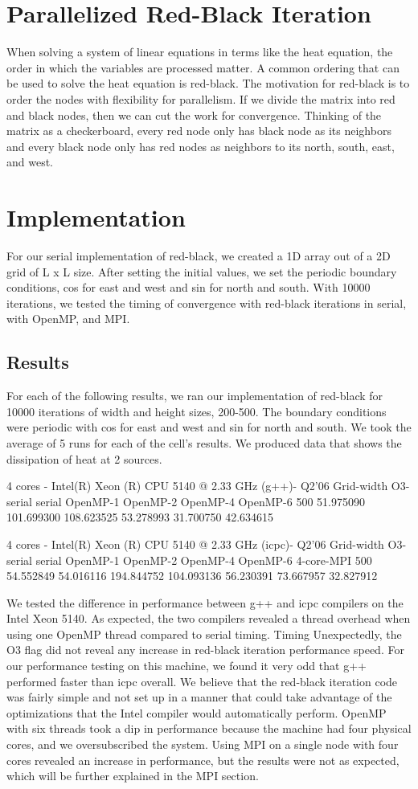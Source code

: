 \documentclass[paper=a4, fontsize=11pt]{scrartcl} %
\numberwithin{equation}{section} %
\numberwithin{figure}{section} %
\numberwithin{table}{section} %
\begin{document}
\section{Parallelized Red-Black Iteration}
When solving a system of linear equations in terms like the heat equation, the order in which the variables are processed matter. A common ordering that can be used to solve the heat equation is red-black. The motivation for red-black is to order the nodes with flexibility for parallelism. If we divide the matrix into red and black nodes, then we can cut the work for convergence. Thinking of the matrix as a checkerboard, every red node only has black node as its neighbors and every black node only has red nodes as neighbors to its north, south, east, and west.

\section{Implementation}
For our serial implementation of red-black, we created a 1D array out of a 2D grid of L x L size. After setting the initial values, we set the periodic boundary conditions, cos for east and west and sin for north and south. With 10000 iterations, we tested the timing of convergence with red-black iterations in serial, with OpenMP, and MPI. 

\subsection{Results}
For each of the following results, we ran our implementation of red-black for 10000 iterations of width and height sizes, 200-500. The boundary conditions were periodic with cos for east and west and sin for north and south. We took the average of 5 runs for each of the cell's results. We produced data that shows the dissipation of heat at 2 sources.

4 cores - Intel(R) Xeon (R) CPU 5140 @ 2.33 GHz (g++)- Q2'06
Grid-width O3-serial serial OpenMP-1 OpenMP-2 OpenMP-4 OpenMP-6
500 51.975090 101.699300 108.623525 53.278993 31.700750 42.634615

4 cores - Intel(R) Xeon (R) CPU 5140 @ 2.33 GHz (icpc)- Q2'06
Grid-width O3-serial serial OpenMP-1 OpenMP-2 OpenMP-4 OpenMP-6 4-core-MPI
500 54.552849 54.016116 194.844752 104.093136 56.230391 73.667957 32.827912

We tested the difference in performance between g++ and icpc compilers on the Intel Xeon 5140. As expected, the two compilers revealed a thread overhead when using one OpenMP thread compared to serial timing. Timing Unexpectedly, the O3 flag did not reveal any increase in red-black iteration performance speed. For our performance testing on this machine, we found it very odd that g++ performed faster than icpc overall. We believe that the red-black iteration code was fairly simple and not set up in a manner that could take advantage of the optimizations that the Intel compiler would automatically perform. OpenMP with six threads took a dip in performance because the machine had four physical cores, and we oversubscribed the system. Using MPI on a single node with four cores revealed an increase in performance, but the results were not as expected, which will be further explained in the MPI section. 
\end{document}
